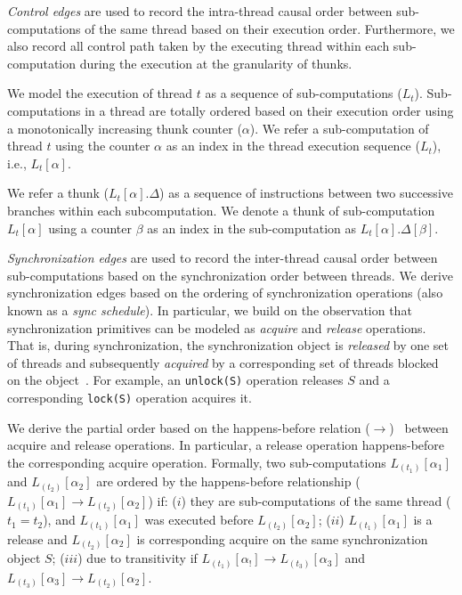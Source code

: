  {\em Control edges}  are used to record the intra-thread causal order between sub-computations of the same thread
based on their execution order. Furthermore, we also record all control path taken by the executing thread within each sub-computation during the execution at the granularity of {thunks}.  

We model the execution of thread $t$ as a sequence of sub-computations ($L_t$).  Sub-computations in a thread are totally ordered based on their execution order using a monotonically increasing thunk counter ($\alpha$). We refer a sub-computation of thread $t$ using the counter $\alpha$ as an index in the thread execution sequence ($L_t$), i.e., $L_t[\alpha]$.  

We refer a thunk ($L_t[\alpha].\Delta$) as a sequence of instructions between two successive branches within each subcomputation. We denote a thunk of sub-computation $L_t[\alpha]$ using a counter $\beta$ as an index in the sub-computation as $L_t[\alpha].\Delta[\beta]$.  


  {\em Synchronization edges}   are
used to record the inter-thread causal order between sub-computations based on the synchronization order between threads. 
We derive synchronization edges based on the ordering of synchronization operations (also known as a {\em sync schedule}). In particular,  we build on the observation that synchronization primitives can be modeled as {\em acquire} and {\em release} operations. That is,   during synchronization, the synchronization object is {\em released} by one set of threads and subsequently  {\em acquired} by a corresponding set of threads blocked on the object~\cite{fast-track-pldi}. For example, an {\tt unlock(S)} operation releases $S$
and a corresponding {\tt lock(S)} operation acquires it.



We derive the partial order based on the happens-before relation
($\rightarrow$)~\cite{djit,fast-track-pldi} between acquire and release operations. In particular, a release
operation happens-before the corresponding acquire operation.
Formally, two sub-computations $L_{(t_1)}[\alpha_1]$ and
$L_{(t_2)}[\alpha_2]$ are ordered by the happens-before relationship ($L_{(t_1)}[\alpha_1] \rightarrow
L_{(t_2)}[\alpha_2]$) if:  ($i$)  they are sub-computations of the
same thread ($t_1 = t_2$), and $L_{(t_1)}[\alpha_1]$ was executed before $L_{(t_2)}[\alpha_2]$; ($ii$)  $L_{(t_1)}[\alpha_1]$  is a release and $L_{(t_2)}[\alpha_2]$ is corresponding acquire on the same synchronization object $S$; ($iii$) due to transitivity if  
 $L_{(t_1)}[\alpha_!] \rightarrow L_{(t_3)}[\alpha_3] $ and $L_{(t_3)}[\alpha_3]  \rightarrow L_{(t_2)}[\alpha_2]$.


